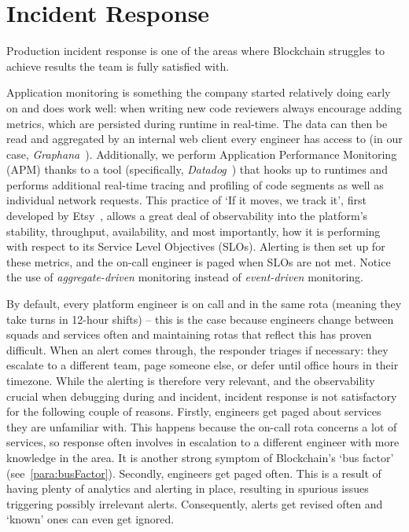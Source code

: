 \documentclass[conference]{IEEEtran}
\begin{document}
    \section{Incident Response}\label{sec:incident-response}

    Production incident response is one of the areas where Blockchain struggles to achieve results the team is fully satisfied with.

    Application monitoring is something the company started relatively doing early on and does work well: when writing new code reviewers always encourage adding metrics, which are persisted during runtime in real-time.
    The data can then be read and aggregated by an internal web client every engineer has access to (in our case, \textit{Graphana}~\cite{grafana}).
    Additionally, we perform Application Performance Monitoring (APM) thanks to a tool (specifically, \textit{Datadog}~\cite{datadogApm}) that hooks up to runtimes and performs additional real-time tracing and profiling of code segments as well as individual network requests.
    This practice of `If it moves, we track it', first developed by Etsy~\cite{etsyStatsd}, allows a great deal of observability into the platform's stability, throughput, availability, and most importantly, how it is performing with respect to its Service Level Objectives (SLOs).
    Alerting is then set up for these metrics, and the on-call engineer is paged when SLOs are not met.
    Notice the use of \emph{aggregate-driven} monitoring instead of \emph{event-driven} monitoring.

    By default, every platform engineer is on call and in the same rota (meaning they take turns in 12-hour shifts) -- this is the case because engineers change between squads and services often and maintaining rotas that reflect this has proven difficult.
    When an alert comes through, the responder triages if necessary: they escalate to a different team, page someone else, or defer until office hours in their timezone.
    While the alerting is therefore very relevant, and the observability crucial when debugging during and incident, incident response is not satisfactory for the following couple of reasons.
    Firstly, engineers get paged about services they are unfamiliar with.
    This happens because the on-call rota concerns a lot of services, so response often involves in escalation to a different engineer with more knowledge in the area.
    It is another strong symptom of Blockchain's `bus factor' (see~\ref{para:busFactor}).
    Secondly, engineers get paged often.
    This is a result of having plenty of analytics and alerting in place, resulting in spurious issues triggering possibly irrelevant alerts.
    Consequently, alerts get revised often and `known' ones can even get ignored.
\end{document}
